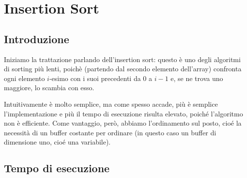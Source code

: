 \chapter{Insertion Sort}

\section{Introduzione}
Iniziamo la trattazione parlando dell'insertion sort: questo è uno degli algoritmi di sorting più lenti, poichè (partendo dal secondo elemento dell'array) confronta ogni elemento $i$-esimo con i suoi precedenti da $0$ a $i-1$ e, se ne trova uno maggiore, lo scambia con esso. 

Intuitivamente è molto semplice, ma come spesso accade, più è semplice l'implementazione e più il tempo di esecuzione risulta elevato, poiché l'algoritmo non è efficiente. Come vantaggio, però, abbiamo l'ordinamento sul posto, cioé la necessità di un buffer costante per ordinare (in questo caso un buffer di dimensione uno, cioé una variabile).

\section{Tempo di esecuzione}

%
%
%

